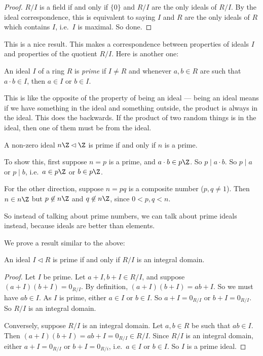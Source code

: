 \documentclass[a4paper]{article}
\begin{document}
\begin{proof}
  $R/I$ is a field if and only if $\{0\}$ and $R/I$ are the only ideals of $R/I$. By the ideal correspondence, this is equivalent to saying $I$ and $R$ are the only ideals of $R$ which contains $I$, i.e.\ $I$ is maximal. So done.
\end{proof}
This is a nice result. This makes a correspondence between properties of ideals $I$ and properties of the quotient $R/I$. Here is another one:

\begin{defi}
  An ideal $I$ of a ring $R$ is \emph{prime} if $I \not= R$ and whenever $a, b \in R$ are such that $a\cdot b \in I$, then $a \in I$ or $b \in I$.
\end{defi}

This is like the opposite of the property of being an ideal --- being an ideal means if we have something in the ideal and something outside, the product is always in the ideal. This does the backwards. If the product of two random things is in the ideal, then one of them must be from the ideal.

\begin{eg}
  A non-zero ideal $n\Z \lhd \Z$ is prime if and only if $n$ is a prime.

  To show this, first suppose $n = p$ is a prime, and $a\cdot b \in p\Z$. So $p \mid a\cdot b$. So $p \mid a$ or $p \mid b$, i.e.\ $a \in p\Z$ or $b \in p\Z$.

  For the other direction, suppose $n = pq$ is a composite number ($p, q \not= 1$). Then $n \in n\Z$ but $p \not\in n\Z$ and $q \not\in n\Z$, since $0 < p, q < n$.
\end{eg}
So instead of talking about prime numbers, we can talk about prime ideals instead, because ideals are better than elements.

We prove a result similar to the above:
\begin{lemma}
  An ideal $I \lhd R$ is prime if and only if $R/I$ is an integral domain.
\end{lemma}

\begin{proof}
  Let $I$ be prime. Let $a + I, b + I \in R/I$, and suppose $(a + I)(b + I) = 0_{R/I}$. By definition, $(a + I)(b + I) = ab + I$. So we must have $ab \in I$. As $I$ is prime, either $a \in I$ or $b \in I$. So $a + I = 0_{R/I}$ or $b + I = 0_{R/I}$. So $R/I$ is an integral domain.

  Conversely, suppose $R/I$ is an integral domain. Let $a, b \in R$ be such that $ab \in I$. Then $(a + I)(b + I) = ab + I = 0_{R/I} \in R/I$. Since $R/I$ is an integral domain, either $a + I = 0_{R/I}$ or $b + I = 0_{R/i}$, i.e.\ $a \in I$ or $b\in I$. So $I$ is a prime ideal.
\end{proof}
\end{document}
